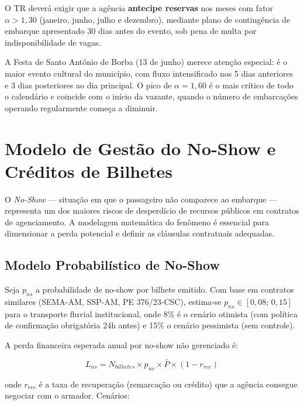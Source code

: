 \documentclass[12pt,a4paper]{article}
\begin{document}
O TR deverá exigir que a agência \textbf{antecipe reservas} nos meses com
fator $\alpha > 1{,}30$ (janeiro, junho, julho e dezembro), mediante plano
de contingência de embarque apresentado 30 dias antes do evento, sob pena
de multa por indisponibilidade de vagas.

A Festa de Santo Antônio de Borba (13 de junho) merece atenção especial: é
o maior evento cultural do município, com fluxo intensificado nos 5 dias
anteriores e 3 dias posteriores ao dia principal. O pico de $\alpha = 1{,}60$
é o mais crítico de todo o calendário e coincide com o início da vazante,
quando o número de embarcações operando regularmente começa a diminuir.

\section{Modelo de Gestão do No-Show e Créditos de Bilhetes}
\label{sec:noshow}

O \textit{No-Show} --- situação em que o passageiro não comparece ao embarque
--- representa um dos maiores riscos de desperdício de recursos públicos em
contratos de agenciamento. A modelagem matemática do fenômeno é essencial para
dimensionar a perda potencial e definir as cláusulas contratuais adequadas.

\subsection{Modelo Probabilístico de No-Show}

Seja $p_{ns}$ a probabilidade de no-show por bilhete emitido. Com base em
contratos similares (SEMA-AM, SSP-AM, PE 376/23-CSC), estima-se
$p_{ns} \in [0{,}08;\,0{,}15]$ para o transporte fluvial institucional,
onde 8\% é o cenário otimista (com política de confirmação obrigatória 24h
antes) e 15\% o cenário pessimista (sem controle).

A perda financeira esperada anual por no-show não gerenciado é:

\begin{equation}
  L_{ns} = N_{bilhetes} \times p_{ns} \times \bar{P} \times (1 - r_{rec})
  \label{eq:noshow}
\end{equation}

onde $r_{rec}$ é a taxa de recuperação (remarcação ou crédito) que a agência
consegue negociar com o armador. Cenários:
\end{document}
